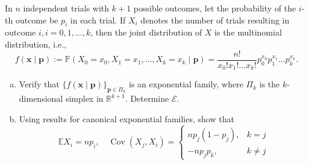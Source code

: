 \begin{exercise}
    In \(n\) independent trials with \(k+1\) possible outcomes, let the probability of the \(i\)-th outcome be \(p_{i}\) in each trial. If \(X_{i}\) denotes the number of trials resulting in outcome \(i, i=0,1, \ldots, k\), then the joint distribution of \(X\) is the multinomial distribution, i.e., 
    \[
        f(\mathbf{x} \mid \mathbf{p}):=\mathbb{P}\left(X_{0}=x_{0}, X_{1}=x_{1}, \ldots, X_{k}=x_{k} \mid \mathbf{p}\right)=\frac{n !}{x_{0} ! x_{1} ! \ldots x_{k} !} p_{0}^{x_{0}} p_{1}^{x_{1}} \ldots p_{k}^{x_{k}}. 
    \]
    \begin{enumerate}[(a)]
        \item Verify that \(\{f(\mathbf{x} \mid \mathbf{p})\}_{\mathbf{p} \in \Pi_{k}}\) is an exponential family, where \(\Pi_{k}\) is the \(k\)-dimensional simplex in \(\mathbb{R}^{k+1}\). Determine \(\mathcal{E}\). 
        \item Using results for canonical exponential families, show that
        \[
            \mathbb{E} X_{i}=n p_{i}, \quad \operatorname{Cov}\left(X_{j}, X_{i}\right)=\left\{\begin{array}{cc}
            n p_{j}\left(1-p_{j}\right), & k=j \\
            -n p_{j} p_{k}, & k \neq j
        \end{array}\right.
        \]
    \end{enumerate}
\end{exercise}

